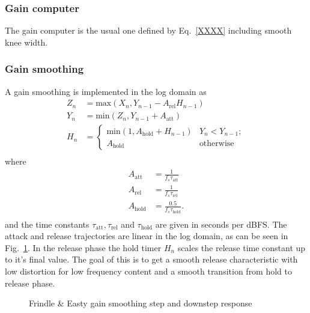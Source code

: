 \documentclass[../main2.tex]{subfiles}
\providecommand{\rootdir}{..}
\begin{document}
\subsubsection{Gain computer}
The gain computer is the usual one defined by Eq.~\ref{XXXX} including smooth knee width.

\subsubsection{Gain smoothing}
A gain smoothing is implemented in the log domain as
\begin{equation}
\begin{split}
Z_n &= \text{max}(X_n, Y_{n-1} - A_{\text{rel}} H_{n-1} )\\
Y_n &= \text{min}(Z_n, Y_{n-1} + A_{\text{att}}) \\
H_n &=
\begin{cases}
    \text{min}(1,A_{\text{hold}} + H_{n-1})	& Y_n < Y_{n-1}; \\
    A_{\text{hold}}					& \text{otherwise}
\end{cases} \\
\end{split}
\end{equation}
where
\begin{equation}
\begin{split}
A_{\text{att}} &= \frac{1}{f_s \tau_{\text{att}}} \\
A_{\text{rel}} &= \frac{1}{f_s \tau_{\text{rel}}} \\
A_{\text{hold}} &= \frac{0.5}{f_s \tau_{\text{hold}}}. \\
\end{split}
\end{equation}
and the time constants $\tau_{\text{att}}, \tau_{\text{rel}}$ and $\tau_{\text{hold}}$ are given in seconds per dBFS. The attack and release trajectories are linear in the log domain, as can be seen in Fig.~\ref{fig:step_frindle_gain}. In the release phase the hold timer $H_n$ scales the release time constant up to it's final value. The goal of this is to get a smooth release characteristic with low distortion for low frequency content and a smooth transition from hold to release phase.

\begin{figure}[h]
\centerline{}
\caption{Frindle \& Easty gain smoothing step and downstep response}
\label{fig:step_frindle_gain}
\end{figure}
\end{document}
